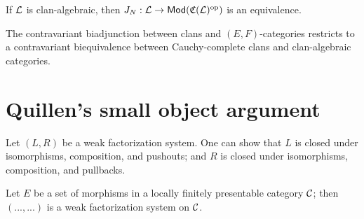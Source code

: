 \documentclass[a4paper]{article}
\begin{document}
\begin{theorem}
  If $\mathcal{L}$ is clan-algebraic, then $J_N : \mathcal{L} \to \mathsf{Mod}(\mathfrak{C}(\mathcal{L})^{\mathrm{op}})$ is an equivalence.
\end{theorem}

\begin{theorem}
  The contravariant biadjunction between clans and $(E,F)$-categories restricts to a contravariant biequivalence between Cauchy-complete clans and clan-algebraic categories.
\end{theorem}

\section{Quillen's small object argument}

Let $(L,R)$ be a weak factorization system.
One can show that $L$ is closed under isomorphisms, composition, and pushouts; and $R$ is closed under isomorphisms, composition, and pullbacks.

\begin{theorem}
  Let $E$ be a set of morphisms in a locally finitely presentable category $\mathcal{C}$; then $(...,...)$ is a weak factorization system on $\mathcal{C}$.
\end{theorem}

\printbibliography
\end{document}
